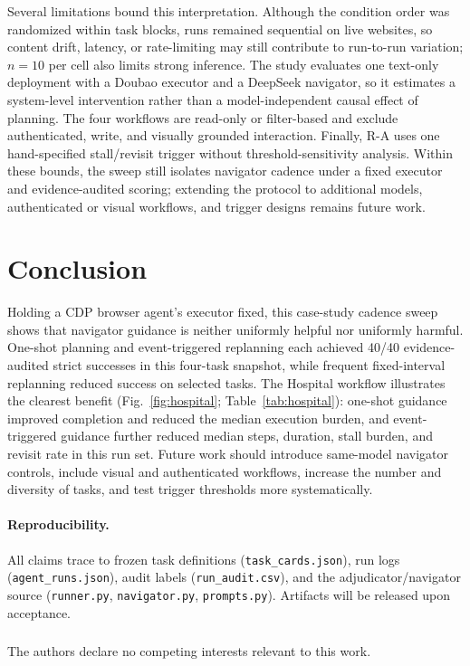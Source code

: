 \documentclass[runningheads]{llncs}
\DeclareRobustCommand{\code}[1]{\allowbreak\nolinkurl{#1}\allowbreak}
\begin{document}
Several limitations bound this interpretation. Although the condition order was
randomized within task blocks, runs remained sequential on live websites, so
content drift, latency, or rate-limiting may still contribute to run-to-run
variation; $n=10$ per cell also limits strong inference. The study evaluates one
text-only deployment with a Doubao executor and a DeepSeek navigator, so it
estimates a system-level intervention rather than a model-independent causal
effect of planning. The four workflows are read-only or filter-based and exclude
authenticated, write, and visually grounded interaction. Finally, R-A uses one
hand-specified stall/revisit trigger without threshold-sensitivity analysis.
Within these bounds, the sweep still isolates navigator cadence under a fixed
executor and evidence-audited scoring; extending the protocol to additional
models, authenticated or visual workflows, and trigger designs remains future
work.

\section{Conclusion}

Holding a CDP browser agent's executor fixed, this case-study cadence sweep
shows that navigator guidance is neither uniformly helpful nor uniformly harmful.
One-shot planning and event-triggered replanning each achieved 40/40
evidence-audited strict successes in this four-task snapshot, while frequent
fixed-interval replanning reduced success on selected tasks. The Hospital workflow illustrates the clearest benefit
(Fig.~\ref{fig:hospital}; Table~\ref{tab:hospital}): one-shot guidance improved
completion and reduced the median execution burden, and event-triggered
guidance further reduced median steps, duration, stall burden, and revisit rate
in this run set. Future work should introduce same-model
navigator controls, include visual and authenticated workflows, increase the
number and diversity of tasks, and test trigger thresholds more systematically.

\paragraph{Reproducibility.}
All claims trace to frozen task definitions (\code{task\_cards.json}), run logs
(\code{agent\_runs.json}), audit labels (\code{run\_audit.csv}), and the
adjudicator/navigator source (\code{runner.py}, \code{navigator.py},
\code{prompts.py}). Artifacts will be released upon acceptance.

\begin{credits}
\subsubsection{\discintname} The authors declare no competing interests
relevant to this work.
\end{credits}



\end{document}
